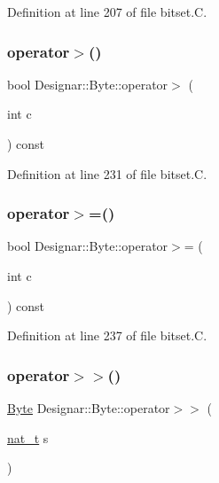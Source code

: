 Definition at line 207 of file bitset.\+C.

\mbox{\label{class_designar_1_1_byte_afa7138b57841b2a8f64c209ae3d79447}} 
\subsubsection{\texorpdfstring{operator$>$()}{operator>()}}
{\footnotesize\ttfamily bool Designar\+::\+Byte\+::operator$>$ (\begin{DoxyParamCaption}\item[{int}]{c }\end{DoxyParamCaption}) const}



Definition at line 231 of file bitset.\+C.

\mbox{\label{class_designar_1_1_byte_a84d13e39d56aa1a32db48af56c9dae21}} 
\subsubsection{\texorpdfstring{operator$>$=()}{operator>=()}}
{\footnotesize\ttfamily bool Designar\+::\+Byte\+::operator$>$= (\begin{DoxyParamCaption}\item[{int}]{c }\end{DoxyParamCaption}) const}



Definition at line 237 of file bitset.\+C.

\mbox{\label{class_designar_1_1_byte_a72ab991a6878042fd48a2d5b39e15034}} 
\subsubsection{\texorpdfstring{operator$>$$>$()}{operator>>()}}
{\footnotesize\ttfamily \hyperlink{class_designar_1_1_byte}{Byte} Designar\+::\+Byte\+::operator$>$$>$ (\begin{DoxyParamCaption}\item[{\hyperlink{namespace_designar_aa72662848b9f4815e7bf31a7cf3e33d1}{nat\+\_\+t}}]{s }\end{DoxyParamCaption})}



